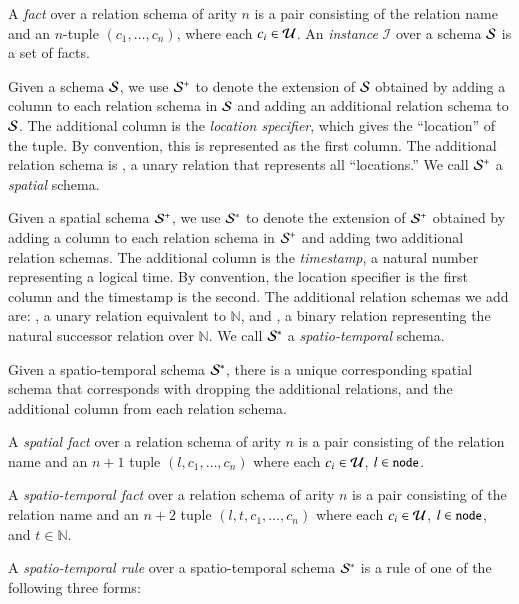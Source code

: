 
A {\em fact} over a relation schema of arity $n$ is a pair consisting of the
relation name and an $n$-tuple $(c_1,\ldots,c_n)$, where each $c_i \in
\univ$.  An \emph{instance} $\mathcal{I}$ over a schema $\schema$ is a
set of facts. 

  Given a schema $\schema$, we use
$\sschema$ to denote the extension of $\schema$ obtained by adding a
column to each relation schema in $\schema$ and adding an additional
relation schema to $\schema$.  The additional column is the {\em location
  specifier}, which gives the ``location'' of the tuple.  By convention, this is
represented as the first column.  The additional relation schema is , a
unary relation that represents all ``locations.''  We call $\sschema$ a
{\em spatial} schema.


Given a spatial schema $\sschema$, we use $\stschema$ to denote the
extension of $\sschema$ obtained by adding a column to each relation schema
in $\sschema$ and adding two additional relation schemas.  The additional
column is the {\em timestamp}, a natural number representing a logical time.  By
convention, the location specifier is the first column and the timestamp is the
second.  The additional relation schemas we add are: , a unary
relation equivalent to $\mathbb{N}$, and , a binary relation
representing the natural successor relation over $\mathbb{N}$.  We call
$\stschema$ a {\em spatio-temporal} schema.

Given a spatio-temporal schema $\stschema$, there is a unique corresponding spatial schema that corresponds with dropping the additional relations, and the additional column from each relation schema.

A {\em spatial fact} over a relation schema of arity $n$ is a pair consisting of the relation name and an $n+1$ tuple $(l,c_1,\ldots,c_n)$ where each $c_i \in \univ$, $l \in \dedalus{node}$.

A {\em spatio-temporal fact} over a relation schema of arity $n$ is a pair consisting of the relation name and an $n+2$ tuple $(l,t,c_1,\ldots,c_n)$ where each $c_i \in \univ$, $l \in \dedalus{node}$, and $t \in \mathbb{N}$.

A {\em spatio-temporal rule} over a spatio-temporal schema $\stschema$ is a rule of one of the following three forms:

